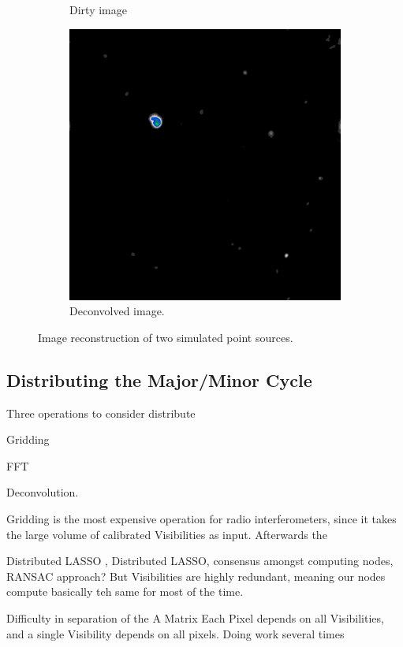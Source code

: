 \begin{figure}[h]
\begin{subfigure}[b]{0.3\linewidth}
		\caption{Dirty image}
		\label{results:points:tclean}
	\end{subfigure}
	\begin{subfigure}[b]{0.3\linewidth}
		\includegraphics[width=\linewidth]{./chapters/01.intro/mk2/clean.png}
		\caption{Deconvolved image.}
		\label{results:points:tclean}
	\end{subfigure}
	
	
	\caption{Image reconstruction of two simulated point sources.}
	\label{results:points}
\end{figure}


\subsection{Distributing the Major/Minor Cycle}

Three operations to consider distribute

Gridding

FFT

Deconvolution.

Gridding is the most expensive operation for radio interferometers, since it takes the large volume of calibrated Visibilities as input. 
Afterwards the 


Distributed LASSO
\cite{mateos2010distributed}, Distributed LASSO, consensus amongst computing nodes, RANSAC approach? But Visibilities are highly redundant, meaning our nodes compute basically teh same for most of the time.


Difficulty in separation of the A Matrix
Each Pixel depends on all Visibilities, and a single Visibility depends on all pixels.
Doing work several times






